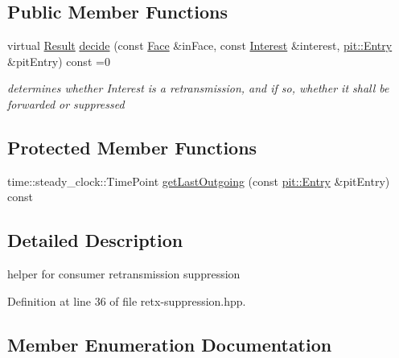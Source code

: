 \subsection*{Public Member Functions}
\begin{DoxyCompactItemize}
\item 
virtual \hyperlink{classnfd_1_1fw_1_1RetxSuppression_af3180f6ce660253c6b415057b817af82}{Result} \hyperlink{classnfd_1_1fw_1_1RetxSuppression_ac6b02ca243173147a01fb986a262bbd8}{decide} (const \hyperlink{classnfd_1_1Face}{Face} \&in\+Face, const \hyperlink{classndn_1_1Interest}{Interest} \&interest, \hyperlink{classnfd_1_1pit_1_1Entry}{pit\+::\+Entry} \&pit\+Entry) const =0\hypertarget{classnfd_1_1fw_1_1RetxSuppression_ac6b02ca243173147a01fb986a262bbd8}{}\label{classnfd_1_1fw_1_1RetxSuppression_ac6b02ca243173147a01fb986a262bbd8}

\begin{DoxyCompactList}\small\item\em determines whether Interest is a retransmission, and if so, whether it shall be forwarded or suppressed \end{DoxyCompactList}\end{DoxyCompactItemize}
\subsection*{Protected Member Functions}
\begin{DoxyCompactItemize}
\item 
time\+::steady\+\_\+clock\+::\+Time\+Point \hyperlink{classnfd_1_1fw_1_1RetxSuppression_a447422cf0be8851330e02f2c53ebde0a}{get\+Last\+Outgoing} (const \hyperlink{classnfd_1_1pit_1_1Entry}{pit\+::\+Entry} \&pit\+Entry) const
\end{DoxyCompactItemize}


\subsection{Detailed Description}
helper for consumer retransmission suppression 

Definition at line 36 of file retx-\/suppression.\+hpp.



\subsection{Member Enumeration Documentation}
